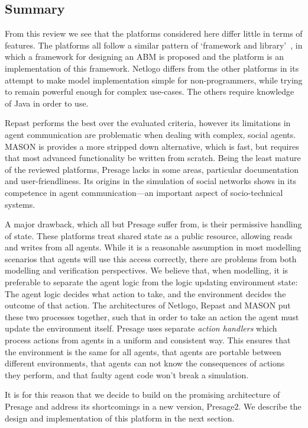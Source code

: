 \subsection{Summary}

From this review we see that the platforms considered here differ little in terms of features. The platforms all follow a similar pattern of `framework and library'~\citep{Railsback2006}, in which a framework for designing an \ac{ABM} is proposed and the platform is an implementation of this framework. Netlogo differs from the other platforms in its attempt to make model implementation simple for non-programmers, while trying to remain powerful enough for complex use-cases. The others require knowledge of Java in order to use. 

Repast performs the best over the evaluated criteria, however its limitations in agent communication are problematic when dealing with complex, social agents. MASON is provides a more stripped down alternative, which is fast, but requires that most advanced functionality be written from scratch. Being the least mature of the reviewed platforms, Presage lacks in some areas, particular documentation and user-friendliness. Its origins in the simulation of social networks shows in its competence in agent communication---an important aspect of socio-technical systems. 

A major drawback, which all but Presage suffer from, is their permissive handling of state. These platforms treat shared state as a public resource, allowing reads and writes from all agents. While it is a reasonable assumption in most modelling scenarios that agents will use this access correctly, there are problems from both modelling and verification perspectives. We believe that, when modelling, it is preferable to separate the agent logic from the logic updating environment state: The agent logic decides what action to take, and the environment decides the outcome of that action. The architectures of Netlogo, Repast and MASON put these two processes together, such that in order to take an action the agent must update the environment itself. Presage uses separate \emph{action handlers} which process actions from agents in a uniform and consistent way. This ensures that the environment is the same for all agents, that agents are portable between different environments, that agents can not know the consequences of actions they perform, and that faulty agent code won't break a simulation.

It is for this reason that we decide to build on the promising  architecture of Presage and address its shortcomings in a new version, Presage2. We describe the design and implementation of this platform in the next section.

